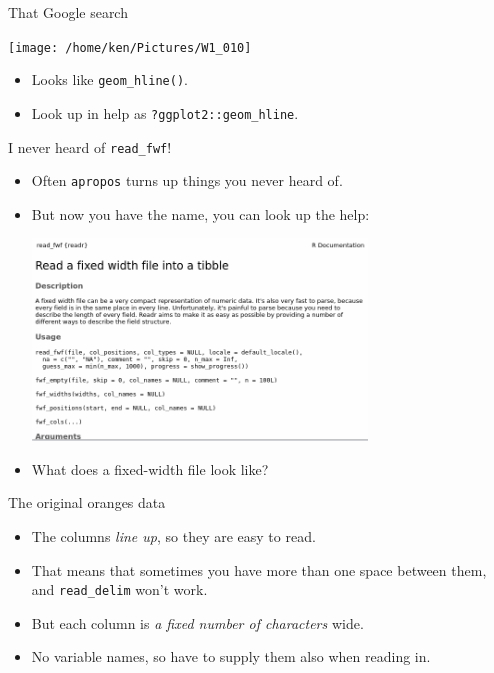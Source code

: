 \documentclass[unknownkeysallowed]{beamer}\usepackage[]{graphicx}\usepackage[]{color}
\begin{document}
\begin{frame}[fragile]{That Google search}
  
  \texttt{[image: /home/ken/Pictures/W1\_010]}
  
  \begin{itemize}
  \item Looks like \verb+geom_hline()+.
    
  \item Look up in help as \verb+?ggplot2::geom_hline+.
  \end{itemize}
  
\end{frame}

\begin{frame}[fragile]{I never heard of \texttt{read\_fwf}!}
  
  \begin{itemize}
  \item Often \texttt{apropos} turns up things you never heard of.
  \item But now you have the name, you can look up the help:
    
\includegraphics[width=0.7\textwidth]{read-fwf}

\item What does a fixed-width file look like?
  \end{itemize}
  
\end{frame}

\begin{frame}[fragile]{The original oranges data}
  


\begin{itemize}
\item The columns \emph{line up}, so they are easy to read.
\item That means that sometimes you have more
than one space between them, and \texttt{read\_delim} won't work.
\item But each column is \emph{a fixed number of characters}
  wide.
\item No variable names, so have to supply them also when reading in.

\end{itemize}
  
\end{frame}
\end{document}
